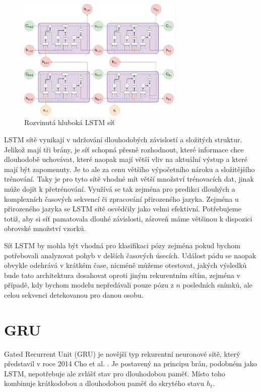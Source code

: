 \begin{figure}
    \centering
    \includegraphics[width=0.70\textwidth]{Figures/LSTM_deep.pdf}
    \caption{Rozvinutá hluboká LSTM síť}
    \label{fig:lstm_deep}
\end{figure}

LSTM sítě vynikají v udržování dlouhodobých závislostí a složitých struktur.
Jelikož mají tři brány, je síť schopná přesně rozhodnout, které informace chce
dlouhodobě uchovávat, které naopak mají větší vliv na aktuální výstup a které
mají být zapomenuty. Je to ale za cenu většího výpočetního nároku a
složitějšího trénování. Taky je pro tyto sítě vhodné mít větší množství
trénovacích dat, jinak může dojít k přetrénování. Využívá se tak zejména pro
predikci dlouhých a komplexních časových sekvencí či zpracování přirozeného
jazyka. Zejména u přirozeného jazyka se LSTM sítě osvědčily jako velmi
efektivní. Potřebujeme totiž, aby si síť pamatovala dlouhé závislosti, zároveň
máme většinou k dispozici obrovské množství vzorků.

Síť LSTM by mohla být vhodná pro klasifikaci pózy zejména pokud bychom
potřebovali analyzovat pohyb v delších časových úsecích. Událost pádu se naopak
obvykle odehrává v krátkém čase, nicméně můžeme otestovat, jakých výsledků bude
tato architektura dosahovat oproti jiným rekurentním sítím, zejména v případě,
kdy bychom modelu nepředávali pouze pózu z $n$ posledních snímků, ale celou
sekvenci detekovanou pro danou osobu.

\section{GRU}

Gated Recurrent Unit (GRU) je novější typ rekurentní neuronové sítě, který
představil v roce 2014 Cho et al. \cite{gru}. Je postavený na principu brán,
podobném jako LSTM, nepotřebuje ale zvlášť stav pro dlouhodobou paměť. Místo
toho kombinuje krátkodobou a dlouhodobou paměť do skrytého stavu $h_t$.

